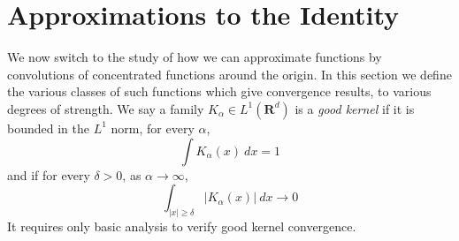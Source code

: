 \section{Approximations to the Identity}

We now switch to the study of how we can approximate functions by convolutions of concentrated functions around the origin. In this section we define the various classes of such functions which give convergence results, to various degrees of strength. We say a family $K_\alpha \in L^1(\mathbf{R}^d)$ is a \emph{good kernel} if it is bounded in the $L^1$ norm, for every $\alpha$,
    \[ \int K_\alpha(x)\ dx = 1 \]
    and if for every $\delta > 0$, as $\alpha \to \infty$,
    \[ \int_{|x| \geq \delta} |K_\alpha(x)|\ dx \to 0 \]
It requires only basic analysis to verify good kernel convergence.

